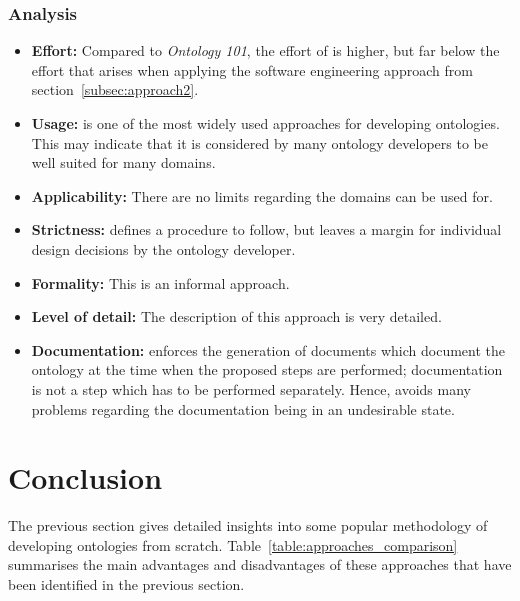 \subsubsection{Analysis}

\begin{itemize}
  \item \textbf{Effort:} Compared to \emph{Ontology 101}, the effort of \methontology is higher, but far below the effort that arises when applying the software engineering approach from section~\ref{subsec:approach2}.
  
  \item \textbf{Usage:} \methontology is one of the most widely used approaches for developing ontologies. This may indicate that it is considered by many ontology developers to be well suited for many domains.
  
  \item \textbf{Applicability:} There are no limits regarding the domains \methontology can be used for.
  
  \item \textbf{Strictness:} \methontology defines a procedure to follow, but leaves a margin for individual design decisions by the ontology developer.
  
  \item \textbf{Formality:} This is an informal approach.
  
  \item \textbf{Level of detail:} The description of this approach is very detailed.
  
  \item \textbf{Documentation:} \methontology enforces the generation of documents which document the ontology at the time when the proposed steps are performed; documentation is not a step which has to be performed separately. Hence, \methontology avoids many problems regarding the documentation being in an undesirable state.
\end{itemize}

\section{Conclusion}
\label{sec:approaches_conclusion}

The previous section gives detailed insights into some popular methodology of developing ontologies from scratch. Table~\ref{table:approaches_comparison} summarises the main advantages and disadvantages of these approaches that have been identified in the previous section.

